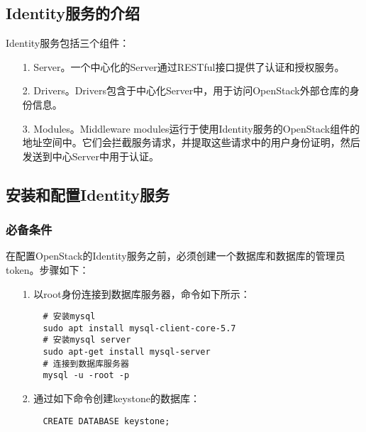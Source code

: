 \documentclass[a4paper,left=2.5cm,right=2.5cm,11pt]{article}
\begin{document}
\subsection{Identity服务的介绍}
	Identity服务包括三个组件：
	\begin{itemize}
		\item[1.] Server。一个中心化的Server通过RESTful接口提供了认证和授权服务。
		\item[2.] Drivers。Drivers包含于中心化Server中，用于访问OpenStack外部仓库的身份信息。
		\item[3.] Modules。Middleware modules运行于使用Identity服务的OpenStack组件的地址空间中。它们会拦截服务请求，并提取这些请求中的用户身份证明，然后发送到中心Server中用于认证。
	\end{itemize}

\subsection{安装和配置Identity服务}
\subsubsection{必备条件}
	在配置OpenStack的Identity服务之前，必须创建一个数据库和数据库的管理员token。步骤如下：
	\begin{itemize}
		\item[1.] 以root身份连接到数据库服务器，命令如下所示：
		\begin{lstlisting}
	# 安装mysql
	sudo apt install mysql-client-core-5.7
	# 安装mysql server
	sudo apt-get install mysql-server
	# 连接到数据库服务器
	mysql -u -root -p
		\end{lstlisting}

		\item[2.] 通过如下命令创建keystone的数据库：
		\begin{lstlisting}
	CREATE DATABASE keystone;
		\end{lstlisting}
	\end{itemize}
	
\end{document}
